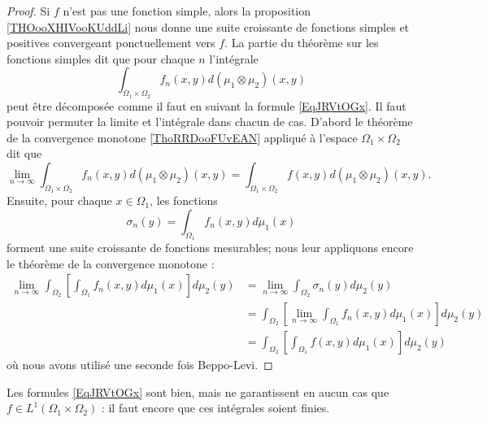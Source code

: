 \begin{proof}
    Si \( f\) n'est pas une fonction simple, alors la proposition \ref{THOooXHIVooKUddLi} nous donne une suite croissante de fonctions simples et positives convergeant ponctuellement vers \( f\). La partie du théorème sur les fonctions simples dit que pour chaque \( n\) l'intégrale
    \begin{equation}
        \int_{\Omega_1\times \Omega_2}f_n(x,y)d(\mu_1\otimes\mu_2)(x,y)
    \end{equation}
    peut être décomposée comme il faut en suivant la formule \eqref{EqJRVtOGx}. Il faut pouvoir permuter la limite et l'intégrale dans chacun de cas. D'abord le théorème de la convergence monotone \ref{ThoRRDooFUvEAN} appliqué à l'espace \( \Omega_1\times \Omega_2\) dit que
    \begin{equation}
        \lim_{n\to \infty} \int_{\Omega_1\times \Omega_2}f_n(x,y)d(\mu_1\otimes \mu_2)(x,y)= \int_{\Omega_1\times \Omega_2}f(x,y)d(\mu_1\otimes \mu_2)(x,y).
    \end{equation}
    Ensuite, pour chaque \( x\in\Omega_1\), les fonctions
    \begin{equation}
        \sigma_n(y)=\int_{\Omega_1}f_n(x,y)d\mu_1(x)
    \end{equation}
    forment une suite croissante de fonctions mesurables; nous leur appliquons encore le théorème de la convergence monotone :
    \begin{subequations}
        \begin{align}
            \lim_{n\to \infty} \int_{\Omega_2}\left[ \int_{\Omega_1}f_n(x,y)d\mu_1(x) \right]d\mu_2(y)&=\lim_{n\to \infty} \int_{\Omega_2}\sigma_n(y)d\mu_2(y)\\
            &=\int_{\Omega_2}\left[\lim_{n\to \infty} \int_{\Omega_1}f_n(x,y)d\mu_1(x)\right]d\mu_2(y)\\
            &=\int_{\Omega_2}\left[ \int_{\Omega_1}f(x,y)d\mu_1(x) \right]d\mu_2(y)
        \end{align}
    \end{subequations}
    où nous avons utilisé une seconde fois Beppo-Levi.
\end{proof}

\begin{remark}
    Les formules \eqref{EqJRVtOGx} sont bien, mais ne garantissent en aucun cas que \( f\in L^1(\Omega_1\times \Omega_2)\) : il faut encore que ces intégrales soient finies.
\end{remark}


